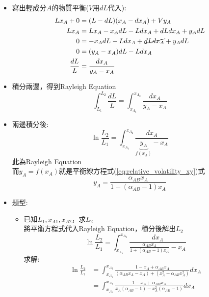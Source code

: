 \documentclass[../main.tex]{subfiles}
\begin{document}
\begin{itemize}
\begin{itemize}
    很合理，減少的液體量等於蒸出的氣體量
    \item 寫出輕成分$A$的物質平衡($V$用$dL$代入):
    \begin{align}
      Lx_A + 0 &= (L-dL)(x_A - dx_A) + V y_A \nonumber\\
      Lx_A &= Lx_A -x_AdL -Ldx_A +dLdx_A + y_AdL \nonumber\\
      0 &= -x_AdL -Ldx_A +\cancel{dLdx_A} + y_AdL \nonumber\\
      0 &= (y_A - x_A)dL - L dx_A \nonumber\\
      \frac{dL}{L} &= \frac{dx_A}{y_A - x_A}
    \end{align}
    \item 積分兩邊，得到Rayleigh Equation
    \begin{equation}
      \int_{L_1}^{L_2} \frac{dL}{L} = \int_{x_{A_1}}^{x_{A_2}} \frac{dx_A}{y_A - x_A}
    \end{equation}
    \item 兩邊積分後:
    \begin{equation}
      \boxed{\ln \frac{L_2}{L_1} = \int_{x_{A_1}}^{x_{A_2}} \frac{dx_A}{\underbrace{y_A}_{f(x_A)} - x_A}}
    \end{equation}
    此為Rayleigh Equation\\
    而$y_A=f(x_A)$就是平衡線方程式(\ref{eq:relative_volatility_xy})式
    \begin{equation}
      y_A = \frac{\alpha_{AB}x_A}{1+\left(\alpha_{AB}-1\right)x_A}
    \end{equation}
    \item 題型:
    \begin{itemize}
      \item 已知$L_1,x_{A1},x_{A2}$，求$L_2$\\
      將平衡方程式代入Rayleigh Equation，積分後解出$L_2$
      \begin{equation}
        \ln \frac{L_2}{L_1} = \int_{x_{A_1}}^{x_{A_2}} \frac{dx_A}{\frac{\alpha_{AB}x_A}{1+\left(\alpha_{AB}-1\right)x_A} - x_A}
      \end{equation}
      求解:
      \begin{align}
        \ln \frac{L_2}{L_1} &= \int_{x_{A_1}}^{x_{A_2}} \frac{1-x_A+\alpha_{AB}x_A}{
          \left(\alpha_{AB}x_A-x_A\right) + \left(x_A^2-\alpha_{AB}x_A^2\right)
        } dx_A \nonumber\\
        &= \int_{x_{A_1}}^{x_{A_2}} \frac{1-x_A+\alpha_{AB}x_A}{
          x_A\left(\alpha_{AB}-1\right)-x_A^2\left(\alpha_{AB} - 1\right)
        } dx_A \nonumber\\

\end{align}
\end{itemize}
\end{itemize}
\end{itemize}
\end{document}
